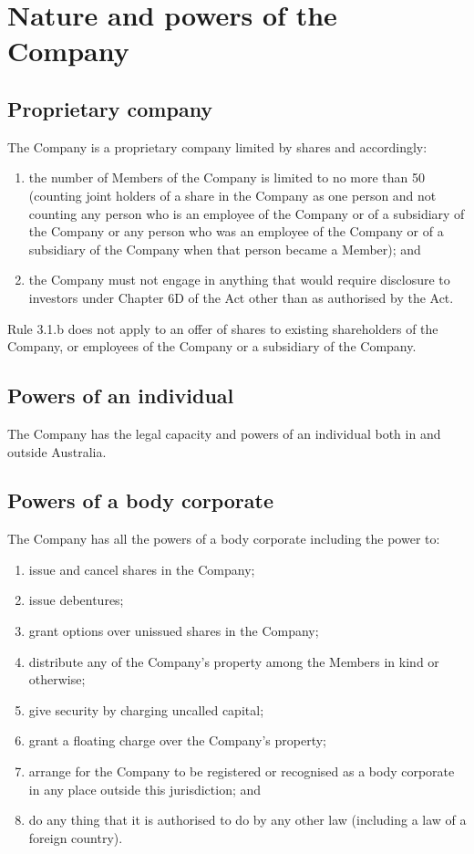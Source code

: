 \section{Nature and powers of the Company}

\subsection{Proprietary company}

The Company is a proprietary company limited by shares and accordingly:

\begin{enumerate}[label=(\alph*)]
    \item the number of Members of the Company is limited to no more than 50 (counting joint holders of a share in the Company as one person and not counting any person who is an employee of the Company or of a subsidiary of the Company or any person who was an employee of the Company or of a subsidiary of the Company when that person became a Member); and
    
    \item the Company must not engage in anything that would require disclosure to investors under Chapter 6D of the Act other than as authorised by the Act.
\end{enumerate}

Rule 3.1.b does not apply to an offer of shares to existing shareholders of the Company, or employees of the Company or a subsidiary of the Company.

\subsection{Powers of an individual}

The Company has the legal capacity and powers of an individual both in and outside Australia.

\subsection{Powers of a body corporate}

The Company has all the powers of a body corporate including the power to:

\begin{enumerate}[label=(\alph*)]
    \item issue and cancel shares in the Company;
    \item issue debentures;
    \item grant options over unissued shares in the Company;
    \item distribute any of the Company's property among the Members in kind or otherwise;
    \item give security by charging uncalled capital;
    \item grant a floating charge over the Company's property;
    \item arrange for the Company to be registered or recognised as a body corporate in any place outside this jurisdiction; and
    \item do any thing that it is authorised to do by any other law (including a law of a foreign country).
\end{enumerate}


